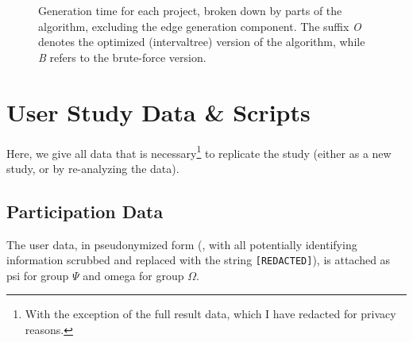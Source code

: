 \begin{figure}
\begin{subfigure}[T]{0.5\textwidth}
\begin{center}
		\end{center}
	\end{subfigure}
	\caption{Generation time for each project, broken down by parts of the algorithm, excluding the edge generation component.
		The suffix \emph{O} denotes the optimized (\gls{intervaltree}) version of the algorithm, while \emph{B} refers to the brute-force version.
	}\label{fig:techevalnoedges}
\end{figure}

\section{User Study Data \& Scripts}\label{app:scripts}
Here, we give all data that is necessary\footnote{
	With the exception of the full result data, which I have redacted for privacy reasons.
} to replicate the study (either as a new study, or by re-analyzing the data).

\subsection{Participation Data}
The user data, in pseudonymized form (\ie, with all potentially identifying information scrubbed and replaced with the string \texttt{[REDACTED]}), is attached as \gls{psi} for group $\Psi$ and \gls{omega} for group $\Omega$.

